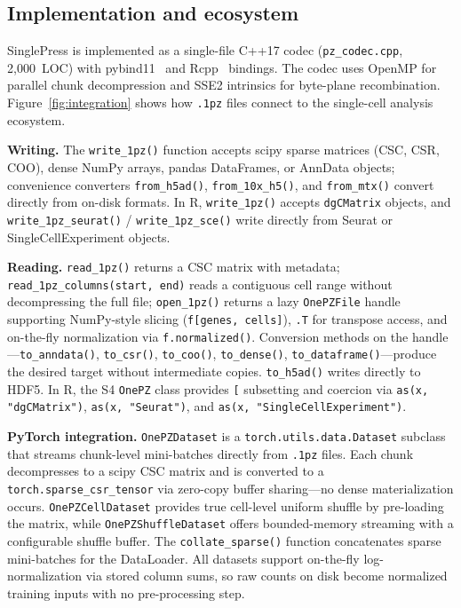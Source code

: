 \documentclass[10pt,twocolumn,letterpaper]{article}
\begin{document}
\subsection{Implementation and ecosystem}

SinglePress is implemented as a single-file C++17 codec (\texttt{pz\_codec.cpp}, 2{,}000~LOC) with pybind11~\cite{pybind11} and Rcpp~\cite{eddelbuettel2011rcpp} bindings.
The codec uses OpenMP for parallel chunk decompression and SSE2 intrinsics for byte-plane recombination.
Figure~\ref{fig:integration} shows how \texttt{.1pz} files connect to the single-cell analysis ecosystem.

\textbf{Writing.}
The \texttt{write\_1pz()} function accepts scipy sparse matrices (CSC, CSR, COO), dense NumPy arrays, pandas DataFrames, or AnnData objects; convenience converters \texttt{from\_h5ad()}, \texttt{from\_10x\_h5()}, and \texttt{from\_mtx()} convert directly from on-disk formats.
In R, \texttt{write\_1pz()} accepts \texttt{dgCMatrix} objects, and \texttt{write\_1pz\_seurat()} / \texttt{write\_1pz\_sce()} write directly from Seurat or SingleCellExperiment objects.

\textbf{Reading.}
\texttt{read\_1pz()} returns a CSC matrix with metadata; \texttt{read\_1pz\_columns(start, end)} reads a contiguous cell range without decompressing the full file; \texttt{open\_1pz()} returns a lazy \texttt{OnePZFile} handle supporting NumPy-style slicing (\texttt{f[genes, cells]}), \texttt{.T} for transpose access, and on-the-fly normalization via \texttt{f.normalized()}.
Conversion methods on the handle---\texttt{to\_anndata()}, \texttt{to\_csr()}, \texttt{to\_coo()}, \texttt{to\_dense()}, \texttt{to\_dataframe()}---produce the desired target without intermediate copies.
\texttt{to\_h5ad()} writes directly to HDF5.
In R, the S4 \texttt{OnePZ} class provides \texttt{[} subsetting and coercion via \texttt{as(x, "dgCMatrix")}, \texttt{as(x, "Seurat")}, and \texttt{as(x, "SingleCellExperiment")}.

\textbf{PyTorch integration.}
\texttt{OnePZDataset} is a \texttt{torch.utils.data.Dataset} subclass that streams chunk-level mini-batches directly from \texttt{.1pz} files.
Each chunk decompresses to a scipy CSC matrix and is converted to a \texttt{torch.sparse\_csr\_tensor} via zero-copy buffer sharing---no dense materialization occurs.
\texttt{OnePZCellDataset} provides true cell-level uniform shuffle by pre-loading the matrix, while \texttt{OnePZShuffleDataset} offers bounded-memory streaming with a configurable shuffle buffer.
The \texttt{collate\_sparse()} function concatenates sparse mini-batches for the DataLoader.
All datasets support on-the-fly log-normalization via stored column sums, so raw counts on disk become normalized training inputs with no pre-processing step.
\end{document}
